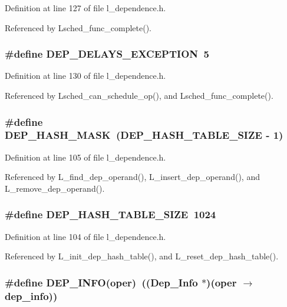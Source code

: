 Definition at line 127 of file l\_\-dependence.h.

Referenced by Lsched\_\-func\_\-complete().
\subsubsection{\setlength{\rightskip}{0pt plus 5cm}\#define DEP\_\-DELAYS\_\-EXCEPTION~5}\label{l__dependence_8h_f54c8a0b866148e1cef586112452ed13}




Definition at line 130 of file l\_\-dependence.h.

Referenced by Lsched\_\-can\_\-schedule\_\-op(), and Lsched\_\-func\_\-complete().
\subsubsection{\setlength{\rightskip}{0pt plus 5cm}\#define DEP\_\-HASH\_\-MASK~(DEP\_\-HASH\_\-TABLE\_\-SIZE - 1)}\label{l__dependence_8h_2b4b2ea3fee3c4efcba5e5d876784f3f}




Definition at line 105 of file l\_\-dependence.h.

Referenced by L\_\-find\_\-dep\_\-operand(), L\_\-insert\_\-dep\_\-operand(), and L\_\-remove\_\-dep\_\-operand().
\subsubsection{\setlength{\rightskip}{0pt plus 5cm}\#define DEP\_\-HASH\_\-TABLE\_\-SIZE~1024}\label{l__dependence_8h_d753d4c2f7a70931c90e6b133a09cd40}




Definition at line 104 of file l\_\-dependence.h.

Referenced by L\_\-init\_\-dep\_\-hash\_\-table(), and L\_\-reset\_\-dep\_\-hash\_\-table().
\subsubsection{\setlength{\rightskip}{0pt plus 5cm}\#define DEP\_\-INFO(oper)~((\bf{Dep\_\-Info} $\ast$)(oper $\rightarrow$ dep\_\-info))}\label{l__dependence_8h_0fa8d67fefe7bbeb158c334702bdf1a9}




